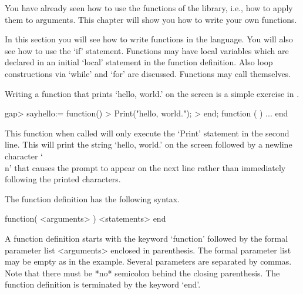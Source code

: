 


You have  already seen how to  use the functions   of the {\GAP} library,
i.e., how to apply them to arguments.  This chapter  will show you how to
write your own functions.

In  this section  you will  see  how  to write  functions  in the  {\GAP}
language.  You will also see  how to use  the `if' statement.   Functions
may  have  local variables   which are  declared   in an  initial `local'
statement in the function definition. Also loop constructions via
`while' and `for' are discussed. Functions may call themselves.


Writing a function that prints `hello, world.'  on the screen is a simple
exercise in {\GAP}.

\beginexample
    gap> sayhello:= function()
    > Print("hello, world.\n");
    > end;
    function (  ) ... end
\endexample

This function when called will only execute the  `Print' statement in the
second line.  This will  print the string  `hello, world.'  on the screen
followed by a  newline character `\\n' that causes  the {\GAP} prompt  to
appear  on the next  line rather  than  immediately following the printed
characters.

The function definition has the following syntax.

\)\fmark function( <arguments> ) <statements> end

A function definition starts with the keyword `function' followed  by the
formal  parameter list <arguments> enclosed  in  parenthesis.  The formal
parameter list  may be empty as in  the example.  Several  parameters are
separated by commas.  Note that there  must be  *no* semicolon behind the
closing   parenthesis.   The  function  definition  is  terminated by the
keyword `end'.

